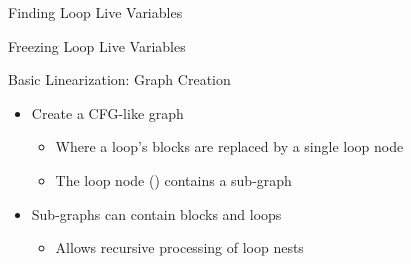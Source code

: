 
\begin{frame}{Finding Loop Live Variables}

\end{frame}


\begin{frame}{Freezing Loop Live Variables}

\end{frame}


\begin{frame}{Basic Linearization: Graph Creation}

\begin{itemize}
    \item Create a CFG-like graph
    \begin{itemize}
        \item Where a loop's blocks are replaced by a single loop node
        \item The loop node () contains a sub-graph
    \end{itemize}
    \item Sub-graphs can contain blocks and loops
    \begin{itemize}
        \item Allows recursive processing of loop nests
    \end{itemize}
\end{itemize}


\end{frame}


